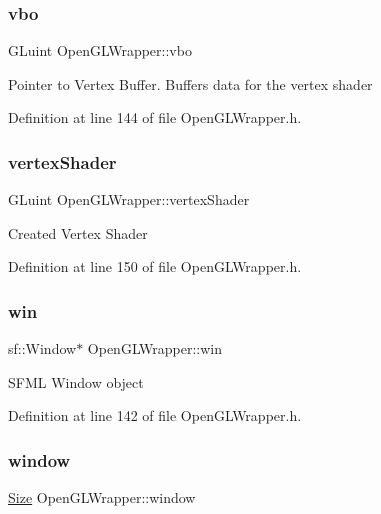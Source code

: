 \subsubsection{\texorpdfstring{vbo}{vbo}}
{\footnotesize\ttfamily G\+Luint Open\+G\+L\+Wrapper\+::vbo\hspace{0.3cm}{\ttfamily [private]}}

Pointer to Vertex Buffer. Buffers data for the vertex shader 

Definition at line 144 of file Open\+G\+L\+Wrapper.\+h.

\mbox{\label{classOpenGLWrapper_a1df1740f86a127eaa65fa4d2e767a86a}} 
\subsubsection{\texorpdfstring{vertexShader}{vertexShader}}
{\footnotesize\ttfamily G\+Luint Open\+G\+L\+Wrapper\+::vertex\+Shader\hspace{0.3cm}{\ttfamily [private]}}

Created Vertex Shader 

Definition at line 150 of file Open\+G\+L\+Wrapper.\+h.

\mbox{\label{classOpenGLWrapper_a021c9b98a096b8cffc78c7eac37a03c6}} 
\subsubsection{\texorpdfstring{win}{win}}
{\footnotesize\ttfamily sf\+::\+Window$\ast$ Open\+G\+L\+Wrapper\+::win\hspace{0.3cm}{\ttfamily [private]}}

S\+F\+ML Window object 

Definition at line 142 of file Open\+G\+L\+Wrapper.\+h.

\mbox{\label{classOpenGLWrapper_ae43805c83ddf7c554d85ca9941d440d1}} 
\subsubsection{\texorpdfstring{window}{window}}
{\footnotesize\ttfamily \mbox{\hyperlink{classSize}{Size}} Open\+G\+L\+Wrapper\+::window\hspace{0.3cm}{\ttfamily [private]}}


